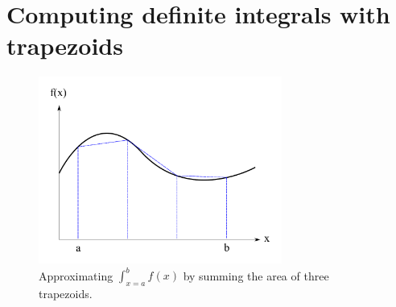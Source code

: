 \documentclass{tmr}
\begin{document}




\section{Computing definite integrals with trapezoids}

\begin{figure}[t]
\centering
\includegraphics[width=8cm]{integral_diag.pdf}
\caption{Approximating $\int_{x=a}^{b} f(x)$ by summing the area of three trapezoids.
\label{trapezoidfig}}
\end{figure}
\end{document}
